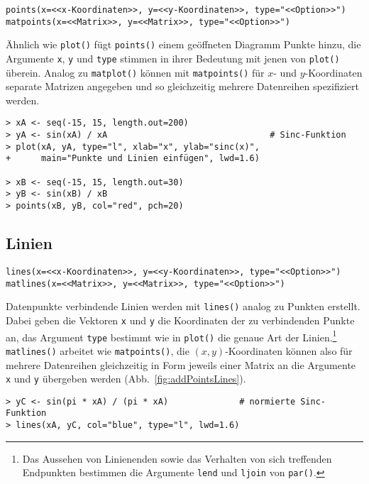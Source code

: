 \begin{lstlisting}
points(x=<<x-Koordinaten>>, y=<<y-Koordinaten>>, type="<<Option>>")
matpoints(x=<<Matrix>>, y=<<Matrix>>, type="<<Option>>")
\end{lstlisting}

Ähnlich wie \lstinline!plot()! fügt \lstinline!points()! einem geöffneten Diagramm Punkte hinzu, die Argumente \lstinline!x!, \lstinline!y! und \lstinline!type! stimmen in ihrer Bedeutung mit jenen von \lstinline!plot()! überein. Analog zu \lstinline!matplot()! können mit \lstinline!matpoints()! für $x$- und $y$-Koordinaten separate Matrizen angegeben und so gleichzeitig mehrere Datenreihen spezifiziert werden.
\begin{lstlisting}
> xA <- seq(-15, 15, length.out=200)
> yA <- sin(xA) / xA                                # Sinc-Funktion
> plot(xA, yA, type="l", xlab="x", ylab="sinc(x)",
+      main="Punkte und Linien einfügen", lwd=1.6)

> xB <- seq(-15, 15, length.out=30)
> yB <- sin(xB) / xB
> points(xB, yB, col="red", pch=20)
\end{lstlisting}

\subsection{Linien}
\label{sec:lines}

\begin{lstlisting}
lines(x=<<x-Koordinaten>>, y=<<y-Koordinaten>>, type="<<Option>>")
matlines(x=<<Matrix>>, y=<<Matrix>>, type="<<Option>>")
\end{lstlisting}

Datenpunkte verbindende Linien werden mit \lstinline!lines()! analog zu Punkten erstellt. Dabei geben die Vektoren \lstinline!x! und \lstinline!y! die Koordinaten der zu verbindenden Punkte an, das Argument \lstinline!type! bestimmt wie in \lstinline!plot()! die genaue Art der Linien.\footnote{Das Aussehen von Linienenden sowie das Verhalten von sich treffenden Endpunkten bestimmen die Argumente \lstinline!lend! und \lstinline!ljoin! von \lstinline!par()!.} \lstinline!matlines()! arbeitet wie \lstinline!matpoints()!, die $(x, y)$-Koordinaten können also für mehrere Datenreihen gleichzeitig in Form jeweils einer Matrix an die Argumente \lstinline!x! und \lstinline!y! übergeben werden (Abb.\ \ref{fig:addPointsLines}).
\begin{lstlisting}
> yC <- sin(pi * xA) / (pi * xA)              # normierte Sinc-Funktion
> lines(xA, yC, col="blue", type="l", lwd=1.6)
\end{lstlisting}

